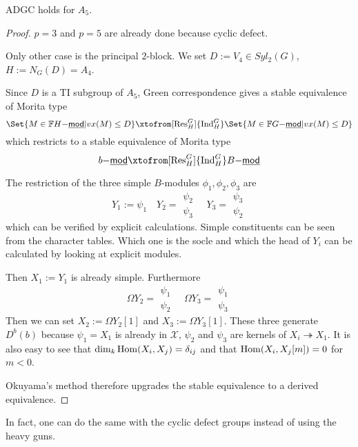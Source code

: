 \documentclass[fontsize=11pt,fleqn,a4paper]{scrartcl}
\begin{document}
\begin{example}
ADGC holds for $A_5$.
\end{example}
\begin{proof}
$p=3$ and $p=5$ are already done because cyclic defect.

Only other case is the principal $2$-block. We set $D:=V_4\in Syl_2(G)$, $H:=N_G(D) = A_4$.

Since $D$ is a TI subgroup of $A_5$, Green correspondence gives a stable equivalence of Morita type
\[\Set{M\in\IF H\mathsf{-\underline{mod}} | vx(M)\leq D} \xtofrom[\Res_H^G]{\Ind_H^G} \Set{M\in\IF G\mathsf{-\underline{mod}} | vx(M)\leq D}\]
which restricts to a stable equivalence of Morita type
\[b\mathsf{-\underline{mod}} \xtofrom[\Res_H^G]{\Ind_H^G} B\mathsf{-\underline{mod}}\]

The restriction of the three simple $B$-modules $\phi_1,\phi_2,\phi_3$ are
\[Y_1 := \psi_1 \quad Y_2 = \begin{array}{c}\psi_2\\\psi_3\end{array} \quad Y_3=\begin{array}{c}\psi_3\\\psi_2\end{array}\]
which can be verified by explicit calculations. Simple constituents can be seen from the character tables. Which one is the socle and which the head of $Y_i$ can be calculated by looking at explicit modules.

Then $X_1:=Y_1$ is already simple. Furthermore
\[\Omega Y_2 = \begin{array}{c} \psi_1 \\ \psi_2 \end{array} \quad \Omega Y_3 = \begin{array}{c} \psi_1 \\ \psi_3 \end{array}\]
Then we can set $X_2:=\Omega Y_2[1]$ and $X_3:=\Omega Y_3[1]$. These three generate $D^b(b)$ because $\psi_1=X_1$ is already in $\mathcal{X}$, $\psi_2$ and $\psi_3$ are kernels of $X_i \twoheadrightarrow X_1$. It is also easy to see that $\dim_k\operatorname{Hom}(X_i,X_j) = \delta_{ij}$ and that $\operatorname{Hom}(X_i,X_j[m])=0$ for $m<0$.

Okuyama's method therefore upgrades the stable equivalence to a derived equivalence.
\end{proof}

\begin{remark}
In fact, one can do the same with the cyclic defect groups instead of using the heavy guns.
\end{remark}
\end{document}
